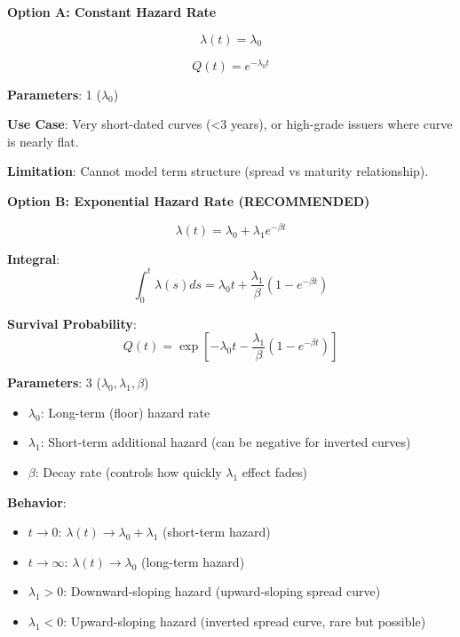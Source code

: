 \documentclass[11pt,a4paper]{article}
\begin{document}
\textbf{Option A: Constant Hazard Rate}

\begin{equation}
\lambda(t) = \lambda_0
\end{equation}

\begin{equation}
Q(t) = e^{-\lambda_0 t}
\end{equation}

\textbf{Parameters}: 1 ($\lambda_0$)

\textbf{Use Case}: Very short-dated curves (<3 years), or high-grade issuers where curve is nearly flat.

\textbf{Limitation}: Cannot model term structure (spread vs maturity relationship).

\vspace{0.5cm}

\textbf{Option B: Exponential Hazard Rate (RECOMMENDED)}

\begin{equation}
\lambda(t) = \lambda_0 + \lambda_1 e^{-\beta t}
\end{equation}

\textbf{Integral}:
\begin{equation}
\int_0^t \lambda(s)ds = \lambda_0 t + \frac{\lambda_1}{\beta}(1 - e^{-\beta t})
\end{equation}

\textbf{Survival Probability}:
\begin{equation}
Q(t) = \exp\left[-\lambda_0 t - \frac{\lambda_1}{\beta}(1 - e^{-\beta t})\right]
\end{equation}

\textbf{Parameters}: 3 ($\lambda_0, \lambda_1, \beta$)

\begin{itemize}
    \item $\lambda_0$: Long-term (floor) hazard rate
    \item $\lambda_1$: Short-term additional hazard (can be negative for inverted curves)
    \item $\beta$: Decay rate (controls how quickly $\lambda_1$ effect fades)
\end{itemize}

\textbf{Behavior}:
\begin{itemize}
    \item $t \to 0$: $\lambda(t) \to \lambda_0 + \lambda_1$ (short-term hazard)
    \item $t \to \infty$: $\lambda(t) \to \lambda_0$ (long-term hazard)
    \item $\lambda_1 > 0$: Downward-sloping hazard (upward-sloping spread curve)
    \item $\lambda_1 < 0$: Upward-sloping hazard (inverted spread curve, rare but possible)
\end{itemize}
\end{document}
